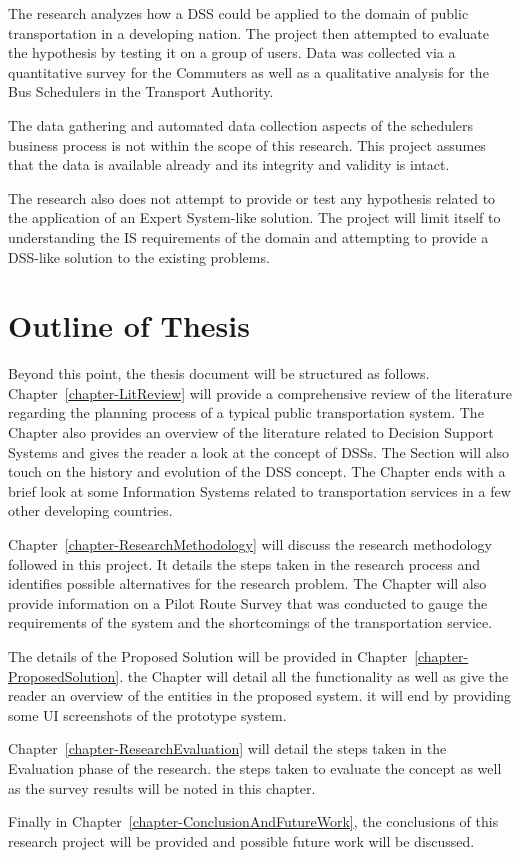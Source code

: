 The research analyzes how a DSS could be applied to the domain of public transportation in a developing nation. The project then attempted to evaluate the hypothesis by testing it on a group of users. Data was collected via a quantitative survey for the Commuters as well as a qualitative analysis for the Bus Schedulers in the Transport Authority.

The data gathering and automated data collection aspects of the schedulers business process is not within the scope of this research. This project assumes that the data is available already and its integrity and validity is intact.

The research also does not attempt to provide or test any hypothesis related to the application of an Expert System-like solution. The project will limit itself to understanding the IS requirements of the domain and attempting to provide a DSS-like solution to the existing problems.

\newpage

\section{Outline of Thesis}
\label{section-OutlineOfThesis}

Beyond this point, the thesis document will be structured as follows. Chapter~\ref{chapter-LitReview} will provide a comprehensive review of the literature regarding the planning process of a typical public transportation system. The Chapter also provides an overview of the literature related to Decision Support Systems and gives the reader a look at the concept of DSSs. The Section will also touch on the history and evolution of the DSS concept. The Chapter ends with a brief look at some Information Systems related to transportation services in a few other developing countries.

Chapter~\ref{chapter-ResearchMethodology} will discuss the research methodology followed in this project. It details the steps taken in the research process and identifies possible alternatives for the research problem. The Chapter will also provide information on a Pilot Route Survey that was conducted to gauge the requirements of the system and the shortcomings of the transportation service.

The details of the Proposed Solution will be provided in Chapter~\ref{chapter-ProposedSolution}. the Chapter will detail all the functionality as well as give the reader an overview of the entities in the proposed system. it will end by providing some UI screenshots of the prototype system.

Chapter~\ref{chapter-ResearchEvaluation} will detail the steps taken in the Evaluation phase of the research. the steps taken to evaluate the concept as well as the survey results will be noted in this chapter.

Finally in Chapter~\ref{chapter-ConclusionAndFutureWork}, the conclusions of this research project will be provided and possible future work will be discussed.